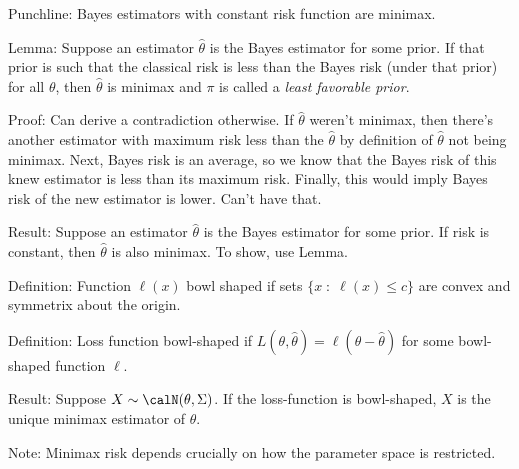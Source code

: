 \documentclass[12pt]{article}
\theoremstyle{plain}
\theoremstyle{definition}
\theoremstyle{remark}
\begin{document}
Punchline:
Bayes estimators with constant risk function are minimax.


Lemma:
Suppose an estimator $\hat{\theta}$ is the Bayes estimator for some
prior.
If that prior is such that the classical risk is less than the Bayes
risk (under that prior) for all $\theta$, then $\hat{\theta}$ is minimax
and $\pi$ is called a \emph{least favorable prior}.

Proof:
Can derive a contradiction otherwise.
If $\hat{\theta}$ weren't minimax, then there's another estimator with
maximum risk less than the $\hat{\theta}$ by definition of
$\hat{\theta}$ not being minimax.
Next, Bayes risk is an average, so we know that the Bayes risk of this
knew estimator is less than its maximum risk.
Finally, this would imply Bayes risk of the new estimator is lower.
Can't have that.

Result:
Suppose an estimator $\hat{\theta}$ is the Bayes estimator for some
prior.
If risk is constant, then $\hat{\theta}$ is also minimax.
To show, use Lemma.


Definition:
Function $\ell(x)$ bowl shaped if sets $\{x\;:\;\ell(x)\leq c\}$ are
convex and symmetrix about the origin.


Definition:
Loss function bowl-shaped if
$L(\theta,\hat{\theta})=\ell(\theta-\hat{\theta})$ for some bowl-shaped
function $\ell$.

Result:
Suppose $X\sim \calN(\theta,\Sigma)$.
If the loss-function is bowl-shaped, $X$ is the unique minimax estimator
of $\theta$.

Note:
Minimax risk depends crucially on how the parameter space is restricted.
\end{document}
